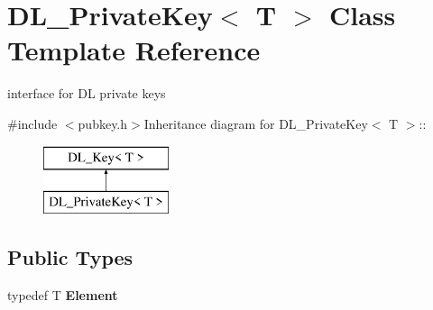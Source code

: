 \hypertarget{class_d_l___private_key}{
\section{DL\_\-PrivateKey$<$ T $>$ Class Template Reference}
\label{class_d_l___private_key}
}


interface for DL private keys  


{\ttfamily \#include $<$pubkey.h$>$}Inheritance diagram for DL\_\-PrivateKey$<$ T $>$::\begin{figure}[H]
\begin{center}
\leavevmode
\includegraphics[height=2cm]{class_d_l___private_key}
\end{center}
\end{figure}
\subsection*{Public Types}
\begin{DoxyCompactItemize}
\item 
\hypertarget{class_d_l___private_key_a3639a8fec074f4176e42a2be8fde6bbf}{
typedef T {\bfseries Element}}
\label{class_d_l___private_key_a3639a8fec074f4176e42a2be8fde6bbf}

\end{DoxyCompactItemize}
